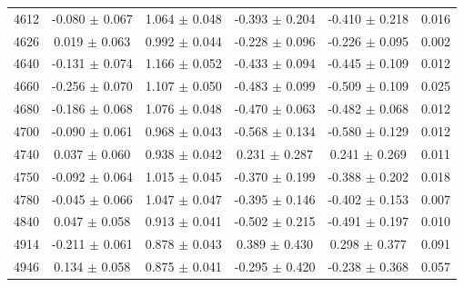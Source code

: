 \begin{table}[h]
{\begin{tabular}{cccccc}
        4612 & -0.080 $\pm$ 0.067 & 1.064 $\pm$ 0.048 & -0.393 $\pm$ 0.204 & -0.410 $\pm$ 0.218 & 0.016\\
        4626 & 0.019 $\pm$ 0.063 & 0.992 $\pm$ 0.044 & -0.228 $\pm$ 0.096 & -0.226 $\pm$ 0.095 & 0.002\\
        4640 & -0.131 $\pm$ 0.074 & 1.166 $\pm$ 0.052 & -0.433 $\pm$ 0.094 & -0.445 $\pm$ 0.109 & 0.012\\
        4660 & -0.256 $\pm$ 0.070 & 1.107 $\pm$ 0.050 & -0.483 $\pm$ 0.099 & -0.509 $\pm$ 0.109 & 0.025\\
        4680 & -0.186 $\pm$ 0.068 & 1.076 $\pm$ 0.048 & -0.470 $\pm$ 0.063 & -0.482 $\pm$ 0.068 & 0.012\\
        4700 & -0.090 $\pm$ 0.061 & 0.968 $\pm$ 0.043 & -0.568 $\pm$ 0.134 & -0.580 $\pm$ 0.129 & 0.012\\
        4740 & 0.037 $\pm$ 0.060 & 0.938 $\pm$ 0.042 & 0.231 $\pm$ 0.287 & 0.241 $\pm$ 0.269 & 0.011\\
        4750 & -0.092 $\pm$ 0.064 & 1.015 $\pm$ 0.045 & -0.370 $\pm$ 0.199 & -0.388 $\pm$ 0.202 & 0.018\\
        4780 & -0.045 $\pm$ 0.066 & 1.047 $\pm$ 0.047 & -0.395 $\pm$ 0.146 & -0.402 $\pm$ 0.153 & 0.007\\
        4840 & 0.047 $\pm$ 0.058 & 0.913 $\pm$ 0.041 & -0.502 $\pm$ 0.215 & -0.491 $\pm$ 0.197 & 0.010\\
        4914 & -0.211 $\pm$ 0.061 & 0.878 $\pm$ 0.043 & 0.389 $\pm$ 0.430 & 0.298 $\pm$ 0.377 & 0.091\\
        4946 & 0.134 $\pm$ 0.058 & 0.875 $\pm$ 0.041 & -0.295 $\pm$ 0.420 & -0.238 $\pm$ 0.368 & 0.057\\
        \hline\hline
        \end{tabular}
        }
\end{table}

